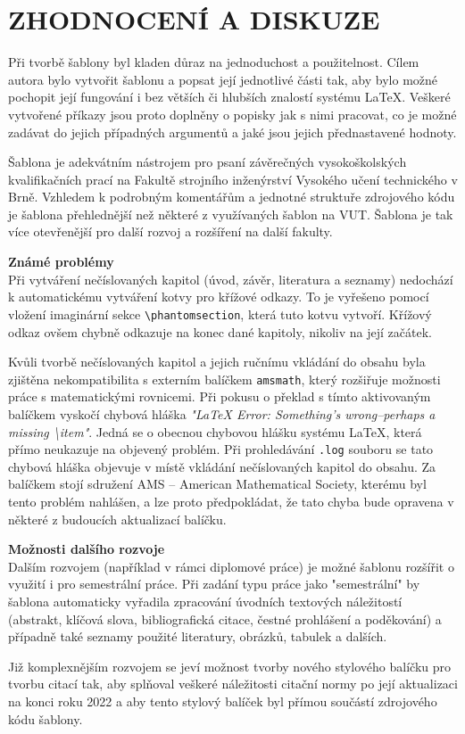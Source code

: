 
\chapter{ZHODNOCENÍ A DISKUZE}
Při tvorbě šablony byl kladen důraz na jednoduchost a použitelnost. Cílem autora bylo vytvořit šablonu a popsat její jednotlivé části tak, aby bylo možné pochopit její fungování i bez větších či hlubších znalostí systému \LaTeX. Veškeré vytvořené příkazy jsou proto doplněny o popisky jak s nimi pracovat, co je možné zadávat do jejich případných argumentů a jaké jsou jejich přednastavené hodnoty.

Šablona je adekvátním nástrojem pro psaní závěrečných vysokoškolských kvalifikačních prací na Fakultě strojního inženýrství Vysokého učení technického v Brně. Vzhledem k podrobným komentářům a jednotné struktuře zdrojového kódu je šablona přehlednější než některé z využívaných šablon na VUT. Šablona je tak více otevřenější pro další rozvoj a rozšíření na další fakulty.

\vspace{8pt}
\textbf{Známé problémy}\\
Při vytváření nečíslovaných kapitol (úvod, závěr, literatura a seznamy) nedochází k automatickému vytváření kotvy pro křížové odkazy. To je vyřešeno pomocí vložení imaginární sekce \verb|\phantomsection|, která tuto kotvu vytvoří. Křížový odkaz ovšem chybně odkazuje na konec dané kapitoly, nikoliv na její začátek.

Kvůli tvorbě nečíslovaných kapitol a jejich ručnímu vkládání do obsahu byla zjištěna nekompatibilita s externím balíčkem \verb|amsmath|, který rozšiřuje možnosti práce s matematickými rovnicemi. Při pokusu o překlad s tímto aktivovaným balíčkem vyskočí chybová hláška \textit{"LaTeX Error: Something's wrong--perhaps a missing \textbackslash item"}. Jedná se o obecnou chybovou hlášku systému \LaTeX, která přímo neukazuje na objevený problém. Při prohledávání \verb|.log| souboru se tato chybová hláška objevuje v místě vkládání nečíslovaných kapitol do obsahu. Za balíčkem stojí sdružení AMS -- American Mathematical Society, kterému byl tento problém nahlášen, a lze proto předpokládat, že tato chyba bude opravena v některé z budoucích aktualizací balíčku.

\vspace{8pt}
\textbf{Možnosti dalšího rozvoje}\\
Dalším rozvojem (například v rámci diplomové práce) je možné šablonu rozšířit o využití i pro semestrální práce. Při zadání typu práce jako "semestrální" by šablona automaticky vyřadila zpracování úvodních textových náležitostí (abstrakt, klíčová slova, bibliografická citace, čestné prohlášení a poděkování) a případně také seznamy použité literatury, obrázků, tabulek a dalších.

Již komplexnějším rozvojem se jeví možnost tvorby nového stylového balíčku pro tvorbu citací tak, aby splňoval veškeré náležitosti citační normy po její aktualizaci na konci roku 2022 a aby tento stylový balíček byl přímou součástí zdrojového kódu šablony.

